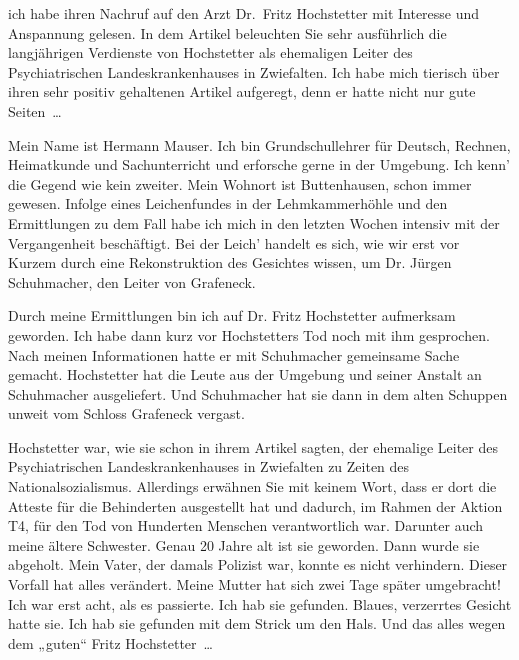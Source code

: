 ich habe ihren Nachruf auf den Arzt Dr.~Fritz Hochstetter mit Interesse und
Anspannung gelesen. In dem Artikel beleuchten Sie sehr ausführlich die
langjährigen Verdienste von Hochstetter als ehemaligen Leiter des
Psychiatrischen Landeskrankenhauses in Zwiefalten. Ich habe mich tierisch über
ihren sehr positiv gehaltenen Artikel aufgeregt, denn er hatte nicht nur gute
Seiten~…

Mein Name ist Hermann Mauser. Ich bin Grundschullehrer für Deutsch, Rechnen,
Heimatkunde und Sachunterricht und erforsche gerne in der Umgebung. Ich kenn’
die Gegend wie kein zweiter. Mein Wohnort ist Buttenhausen, schon immer
gewesen. Infolge eines Leichenfundes in der Lehmkammerhöhle und den
Ermittlungen zu dem Fall habe ich mich in den letzten Wochen intensiv mit der
Vergangenheit beschäftigt. Bei der Leich’ handelt es sich, wie wir erst vor
Kurzem durch eine Rekonstruktion des Gesichtes wissen, um Dr. Jürgen
Schuhmacher, den Leiter von Grafeneck.

Durch meine Ermittlungen bin ich auf Dr. Fritz Hochstetter aufmerksam geworden.
Ich habe dann kurz vor Hochstetters Tod noch mit ihm gesprochen. Nach meinen
Informationen hatte er mit Schuhmacher gemeinsame Sache gemacht. Hochstetter
hat die Leute aus der Umgebung und seiner Anstalt an Schuhmacher ausgeliefert.
Und Schuhmacher hat sie dann in dem alten Schuppen unweit vom Schloss Grafeneck
vergast.

Hochstetter war, wie sie schon in ihrem Artikel sagten, der ehemalige Leiter
des Psychiatrischen Landeskrankenhauses in Zwiefalten zu Zeiten des
Nationalsozialismus. Allerdings erwähnen Sie mit keinem Wort, dass er dort die
Atteste für die Behinderten ausgestellt hat und dadurch, im Rahmen der Aktion
T4, für den Tod von Hunderten Menschen verantwortlich war. Darunter auch meine
ältere Schwester. Genau 20 Jahre alt ist sie geworden. Dann wurde sie abgeholt.
Mein Vater, der damals Polizist war, konnte es nicht verhindern. Dieser Vorfall
hat alles verändert. Meine Mutter hat sich zwei Tage später umgebracht! Ich war
erst acht, als es passierte. Ich hab sie gefunden. Blaues, verzerrtes Gesicht
hatte sie. Ich hab sie gefunden mit dem Strick um den Hals. Und das alles wegen
dem „guten“ Fritz Hochstetter~…

